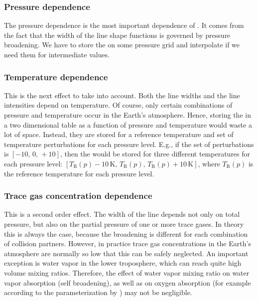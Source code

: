 \subsubsection{Pressure dependence}

The pressure dependence is the most important dependence of
\AbsXsec. It comes from the fact that the width of the line shape
functions is governed by pressure broadening. We have to store the
 on some pressure grid and interpolate if we need them for
intermediate values.

\subsubsection{Temperature dependence}

This is the next effect to take into account. Both the line widths and
the line intensities depend on temperature. Of course, only certain
combinations of pressure and temperature occur in the Earth's
atmosphere. Hence, storing the  in a two dimensional table
as a function of pressure and temperature would waste a lot of space.
Instead, they are stored for a reference temperature and set of
temperature perturbations for each pressure level. E.g., if the set of
perturbations is $[-10,\, 0,\, +10]$, then the  would be stored
for three different temperatures for each pressure level:
$[T_\mathrm{R}(p)-10\,\mbox{K},\, T_\mathrm{R}(p),\, T_\mathrm{R}(p)+10\,\mbox{K}]$, where
$T_\mathrm{R}(p)$ is the reference temperature for each pressure level.

\subsubsection{Trace gas concentration dependence}

This is a second order effect. The width of the line depends not only
on total pressure, but also on the partial pressure of one or more
trace gases. In theory this is always the case, because the broadening
is different for each combination of collision partners. However, in
practice trace gas concentrations in the Earth's atmosphere are
normally so low that this can be safely neglected. An important
exception is water vapor in the lower troposphere, which can reach
quite high volume mixing ratios. Therefore, the effect of water vapor
mixing ratio on water vapor absorption (self broadening), as well as
on oxygen absorption (for example according to the parameterization by
\citet{pwr:93}) may not be negligible.

